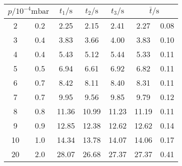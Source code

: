 \label{tab:tabTL4}
	\begin{tabular}{S[table-format=2.0] @{${}\pm{}$} S[table-format=1.1]S[table-format=2.2]S[table-format=2.2]S[table-format=2.2]S[table-format=2.2] @{${}\pm{}$} S[table-format=1.2]}
		\toprule
		 & {$t_1/\si{\second}$} & {$t_2/\si{\second}$} & {$t_3/\si{\second}$} &  \\
		 & 0.2 & 2.25 & 2.15 & 2.41 & 2.27 & 0.08 \\
		 3 & 0.4 & 3.83 & 3.66 & 4.00 & 3.83 & 0.10 \\
		 4 & 0.4 & 5.43 & 5.12 & 5.44 & 5.33 & 0.11 \\
		 5 & 0.5 & 6.94 & 6.61 & 6.92 & 6.82 & 0.11 \\
		 6 & 0.7 & 8.42 & 8.11 & 8.40 & 8.31 & 0.11 \\
		 7 & 0.7 & 9.95 & 9.56 & 9.85 & 9.79 & 0.12 \\
		 8 & 0.8 & 11.36 & 10.99 & 11.23 & 11.19 & 0.11 \\
		 9 & 0.9 & 12.85 & 12.38 & 12.62 & 12.62 & 0.14 \\
		10 & 1.0 & 14.34 & 13.78 & 14.07 & 14.06 & 0.17 \\
		20 & 2.0 & 28.07 & 26.68 & 27.37 & 27.37 & 0.41 \\
		\bottomrule
	\end{tabular}
